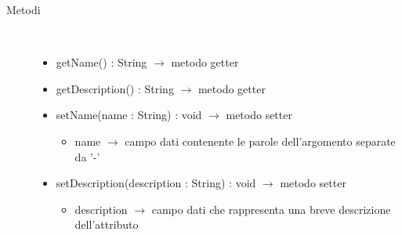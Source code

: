 \begin{description}
\item[Metodi] \hfill \\
\vspace{-7mm}
\begin{itemize}
	\item getName() : String $\rightarrow$ metodo getter
	\item getDescription() : String $\rightarrow$ metodo getter
	\item setName(name : String) : void $\rightarrow$ metodo setter\begin{itemize}
		\item name $\rightarrow$ campo dati contenente le parole dell'argomento separate da '-'
	\end{itemize}
	
	\item setDescription(description : String) : void $\rightarrow$ metodo setter\begin{itemize}
		\item description $\rightarrow$ campo dati che rappresenta una breve descrizione dell'attributo
	\end{itemize}
	
\end{itemize}

\end{description}

\vspace{0.5cm}
\hypertarget{server::data::Questionnaire}{}
